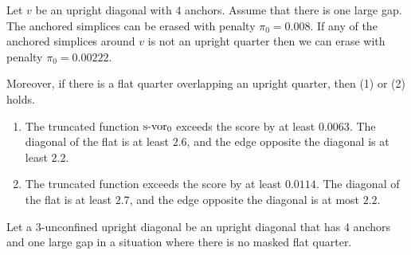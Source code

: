 \begin{lemma}
    \label{lemma:0.008}
Let $v$ be an upright diagonal with $4$ anchors.  Assume that there is
one large gap.  The anchored simplices can be erased with penalty
$\pi_0=0.008$. If any of the anchored simplices around $v$ is not an
upright quarter then we can erase with penalty $\pi_0=0.00222$.

Moreover, if there is a flat quarter overlapping an upright quarter,
then (1) or (2) holds.
    \begin{enumerate}
    \item The truncated function $\operatorname{s-vor}_0$ exceeds the score by at least
    $0.0063$. The diagonal of the flat is at least $2.6$, and the edge
    opposite the diagonal is at least $2.2$.
    \item The truncated function exceeds the score by at least
    $0.0114$.  The diagonal of the flat is at least $2.7$, and the edge
    opposite the diagonal is at most $2.2$.
    \end{enumerate}
\end{lemma}

\begin{definition}
Let a $3$-unconfined upright diagonal be an upright diagonal that
has $4$ anchors and one large gap in a situation where there is no
masked flat quarter.
\end{definition}

